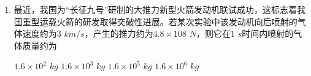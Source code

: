 \begin{enumerate}[leftmargin=0em]
{\begin{enumerate}
\end{enumerate}


}




\item 
{}
最近，我国为“长征九号”研制的大推力新型火箭发动机联试成功，这标志着我国重型运载火箭的研发取得突破性进展。若某次实验中该发动机向后喷射的气体速度约为$ 3 $ $ km/s $，产生的推力约为$ 4.8 \times 108 $ $ N $，则它在$ 1 $ $ s $时间内喷射的气体质量约为  

\fourchoices
{$ 1.6 \times 10^2 $ $ kg $}
{$ 1.6 \times 10^3 $ $ kg $	}
{$ 1.6 \times 10^5 $ $ kg $ }
{$ 1.6 \times 10^6 $ $ kg $}










\end{enumerate}



